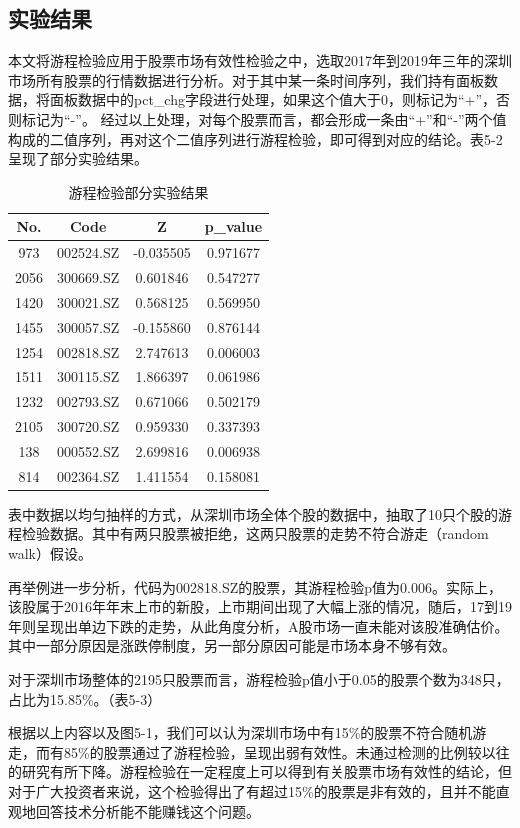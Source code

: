 \documentclass[twoside,longtitle]{LZUthesis}
\begin{document}
\subsection{实验结果}

本文将游程检验应用于股票市场有效性检验之中，选取2017年到2019年三年的深圳市场所有股票的行情数据进行分析。对于其中某一条时间序列，我们持有面板数据，将面板数据中的pct\_chg字段进行处理，如果这个值大于0，则标记为“+”，否则标记为“-”。
经过以上处理，对每个股票而言，都会形成一条由“+”和“-”两个值构成的二值序列，再对这个二值序列进行游程检验，即可得到对应的结论。表5-2呈现了部分实验结果。
\begin{table}[]
\centering
\begin{tabular}{cccc}
\hline
No.  & Code      & Z         & p\_value \\ \hline
973  & 002524.SZ & -0.035505 & 0.971677 \\
2056 & 300669.SZ & 0.601846  & 0.547277 \\
1420 & 300021.SZ & 0.568125  & 0.569950 \\
1455 & 300057.SZ & -0.155860 & 0.876144 \\
1254 & 002818.SZ & 2.747613  & 0.006003 \\
1511 & 300115.SZ & 1.866397  & 0.061986 \\
1232 & 002793.SZ & 0.671066  & 0.502179 \\
2105 & 300720.SZ & 0.959330  & 0.337393 \\
138  & 000552.SZ & 2.699816  & 0.006938 \\
814  & 002364.SZ & 1.411554  & 0.158081 \\ \hline
\end{tabular}
\caption{游程检验部分实验结果}
\end{table}

表中数据以均匀抽样的方式，从深圳市场全体个股的数据中，抽取了10只个股的游程检验数据。其中有两只股票被拒绝，这两只股票的走势不符合游走（random walk）假设。

再举例进一步分析，代码为002818.SZ的股票，其游程检验p值为0.006。实际上，该股属于2016年年末上市的新股，上市期间出现了大幅上涨的情况，随后，17到19年则呈现出单边下跌的走势，从此角度分析，A股市场一直未能对该股准确估价。其中一部分原因是涨跌停制度，另一部分原因可能是市场本身不够有效。

对于深圳市场整体的2195只股票而言，游程检验p值小于0.05的股票个数为348只，占比为15.85\%。（表5-3）

根据以上内容以及图5-1，我们可以认为深圳市场中有15\%的股票不符合随机游走，而有85\%的股票通过了游程检验，呈现出弱有效性。未通过检测的比例较以往的研究有所下降。游程检验在一定程度上可以得到有关股票市场有效性的结论，但对于广大投资者来说，这个检验得出了有超过15\%的股票是非有效的，且并不能直观地回答技术分析能不能赚钱这个问题。
\end{document}
